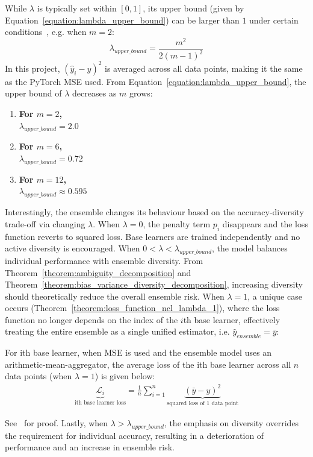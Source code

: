 While $\lambda$ is typically set within $[0, 1]$, its upper bound (given by Equation~\ref{equation:lambda_upper_bound}) can be larger than $1$ under certain conditions~\cite{brown2005managing}, e.g. when $m = 2$: 
\begin{equation}
    \label{equation:lambda_upper_bound}
    \lambda_{upper\_bound} = \frac{m^2}{2(m - 1)^2}
\end{equation}
In this project, $(\hat{y}_i - y)^2$ is averaged across all data points, making it the same as the PyTorch MSE used. From Equation~\ref{equation:lambda_upper_bound}, the upper bound of $\lambda$ decreases as $m$ grows: 
\begin{enumerate}
    \item \textbf{For $m = 2$, } \\
    $\lambda_{upper\_bound} = 2.0$

    \item \textbf{For $m = 6$, } \\
    $\lambda_{upper\_bound} = 0.72$

    \item \textbf{For $m = 12$, } \\
    $\lambda_{upper\_bound} \approx 0.595$
\end{enumerate}

Interestingly, the ensemble changes its behaviour based on the accuracy-diversity trade-off via changing $\lambda$. When $\lambda = 0$, the penalty term $p_i$ disappears and the loss function reverts to squared loss. Base learners are trained independently and no active diversity is encouraged. When $0 < \lambda < \lambda_{upper\_bound}$, the model balances individual performance with ensemble diversity. From Theorem~\ref{theorem:ambiguity_decomposition} and Theorem~\ref{theorem:bias_variance_diversity_decomposition}, increasing diversity should theoretically reduce the overall ensemble risk. When $\lambda = 1$, a unique case occurs (Theorem~\ref{theorem:loss_function_ncl_lambda_1}), where the loss function no longer depends on the index of the $i$th base learner, effectively treating the entire ensemble as a single unified estimator, i.e. $\hat{y}_{ensemble} = \bar{y}$: 
\begin{theorem}\label{theorem:loss_function_ncl_lambda_1}
    For ith base learner, when MSE is used and the ensemble model uses an arithmetic-mean-aggregator, the average loss of the ith base learner across all $n$ data points (when $\lambda = 1$) is given below: 
    \begin{align*}
        \underbrace{\mathcal{L}_i}_{\text{ith base learner loss}} = \frac{1}{n} \sum^{n}_{i = 1} \underbrace{(\bar{y} - y)^2}_{\text{squared loss of 1 data point}}
    \end{align*}
\end{theorem}
See~\cite{brown2003negative} for proof. Lastly, when $\lambda > \lambda_{upper\_bound}$, the emphasis on diversity overrides the requirement for individual accuracy, resulting in a deterioration of performance and an increase in ensemble risk. 

